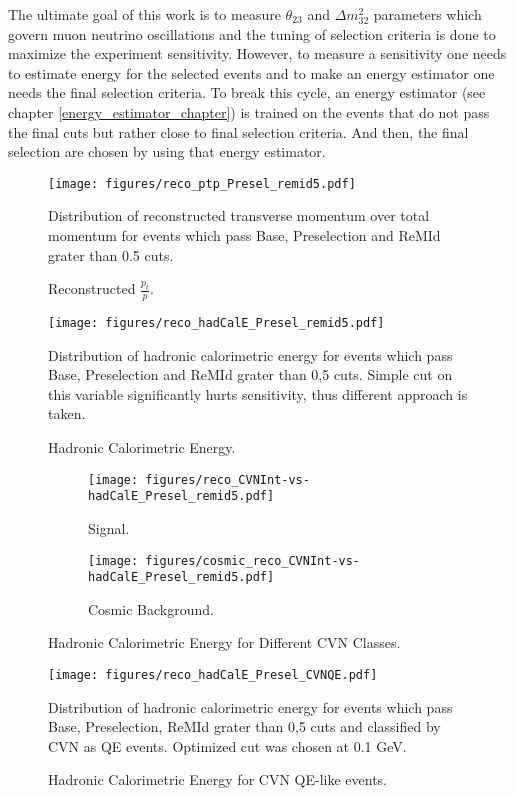 The ultimate goal of this work is to measure $\theta_{23}$ and $\Delta m^2_{32}$ parameters which govern muon
neutrino oscillations and the tuning of selection criteria is done to maximize the experiment sensitivity. However,
to measure a sensitivity one needs to estimate energy for the selected events and to make an energy estimator one 
needs the final selection criteria. To break this cycle, an energy estimator (see chapter \ref{energy_estimator_chapter})
is trained on the events that do not pass the final cuts but rather close to final selection criteria. And then, the final 
selection are chosen by using that energy estimator.
\begin{figure}[h]
\centering
\texttt{[image: figures/reco\_ptp\_Presel\_remid5.pdf]}
\caption{Reconstructed $\frac{p_t}{p}$.}
{Distribution of reconstructed transverse momentum over total momentum for events which pass Base, Preselection and
ReMId grater than 0.5 cuts. }
\label{fig:ptp}
\end{figure}
\begin{figure}[h]
\centering
\texttt{[image: figures/reco\_hadCalE\_Presel\_remid5.pdf]}
\caption{Hadronic Calorimetric Energy.}
{Distribution of hadronic calorimetric energy for events which pass Base, Preselection and ReMId grater than 0,5 cuts. 
Simple cut on this variable significantly hurts sensitivity, thus different approach is taken.}
\label{fig:calHadE}
\end{figure}
\begin{figure}[!th]
\begin{subfigure}[t]{0.95\textwidth}
  \centering
  \texttt{[image: figures/reco\_CVNInt-vs-hadCalE\_Presel\_remid5.pdf]}
  \caption{Signal.}
  \label{fig:cvnVsHadE_sig}
\end{subfigure}
\vspace{0.5cm}
\newline
\begin{subfigure}[t]{0.95\textwidth}
  \centering
  \texttt{[image: figures/cosmic\_reco\_CVNInt-vs-hadCalE\_Presel\_remid5.pdf]}
  \caption{Cosmic Background.}
  \label{fig:cvnVsHadE_bkg}
\end{subfigure}
\caption{ Hadronic Calorimetric Energy for Different CVN Classes.  }
\label{fig:cvnVsHadE}
\end{figure}

\begin{figure}[h]
\centering
\texttt{[image: figures/reco\_hadCalE\_Presel\_CVNQE.pdf]}
\caption{Hadronic Calorimetric Energy for CVN QE-like events.}
{Distribution of hadronic calorimetric energy for events which pass Base, Preselection, ReMId grater than 0,5 cuts and 
classified by CVN as QE events. Optimized cut was chosen at 0.1 GeV. }
\label{fig:calHadEVNQE}
\end{figure}


